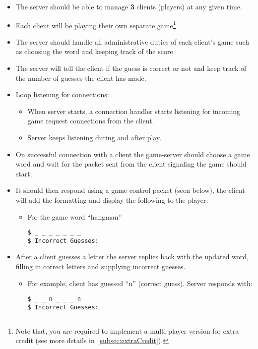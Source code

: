 \documentclass[12pt]{article}
\begin{document}
\begin{itemize}
\item The server should be able to manage {\bf 3} clients (players) at any given time.
\item Each client will be playing their own separate game\footnote{Note that, you are required to implement a multi-player version for extra credit (see more details in~\autoref{subsec:extraCredit}).}.
\item The server should handle all administrative duties of each client's game such as
choosing the word and keeping track of the score.
\item The server will tell the client if the guess is correct or not and keep track of the number of
guesses the client has made.
\item Loop listening for connections:
     \begin{itemize}
       \item When server starts, a connection handler starts listening for incoming game
       request connections from the client.
       \item Server keeps listening during and after play.
     \end{itemize}
\item On successful connection with a client the game-server should choose a game word and
wait for the packet sent from the client signaling the game should start.
\item It should then respond using a game control packet (seen below), the client will add the
formatting and display the following to the player:
\begin{itemize}
\item For the game word ``hangman''
\begin{verbatim}
$ _ _ _ _ _ _ _
$ Incorrect Guesses:
\end{verbatim}
\end{itemize}
\item After a client guesses a letter the server replies back with the updated word, filling in
correct letters and supplying incorrect guesses.
\begin{itemize}
\item For example, client has guessed ``n'' (correct guess).
Server responds with:
\begin{verbatim}
$ _ _ n _ _ _ n
$ Incorrect Guesses:
\end{verbatim}


\end{itemize}
\end{itemize}
\end{document}
